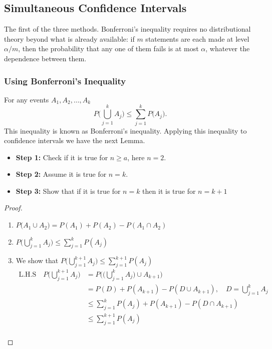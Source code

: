 \documentclass[11pt,a4paper]{article}
\theoremstyle{definition}
\begin{document}
\subsection*{Simultaneous Confidence Intervals}
The first of the three methods. Bonferroni's inequality requires no
distributional theory beyond what is already available: if $m$ statements are
each made at level $\alpha/m$, then the probability that any one of them fails
is at most $\alpha$, whatever the dependence between them.



\subsubsection*{Using Bonferroni's Inequality}

For any events $A_1, A_2,\ldots , A_k$ $$P\Bigg(\bigcup^k_{j=1}A_j\Bigg)\leq \sum^k_{j=1}P\big(A_j\big).$$ This inequality is known as Bonferroni's inequality. Applying this inequality to confidence intervals we have the next Lemma.\\

\begin{itemize}
\item[]\textbf{Step 1:} Check if it is true for $n\geq a$, here $n=2$.
\item[]\textbf{Step 2:} Assume it is true for $n=k$.
\item[]\textbf{Step 3:} Show that if it is true for $n=k$ then it is true for $n=k+1$\\
\end{itemize}


\begin{proof}
\begin{enumerate}
\item $P\big(A_1\cup A_2\big)=P(A_1)+P(A_2)-P(A_1\cap A_2)$
\item $P\Bigg(\bigcup\limits^k_{j=1}A_j\Bigg)\leq \displaystyle{\sum^k_{j=1}P(A_j)}$
\item We show that $\displaystyle{P\Bigg(\bigcup^{k+1}_{j=1}A_j\Bigg)\leq \sum^{k+1}_{j=1}P(A_j)}$
\begin{align*}
\text{L.H.S}\quad  P\Bigg(\bigcup^{k+1}_{j=1}A_j\Bigg) & = P\Bigg(\bigg(\bigcup^k_{j=1}A_j\big)\cup A_{k+1}\Bigg)\\
                                                               & = P(D)+P(A_{k+1})-P(D\cup A_{k+1}),\quad  D=\bigcup^k_{j=1}A_j\\
                                                               &\leq \sum^k_{j=1}P(A_j)+P(A_{k+1})-P(D\cap A_{k+1})\\
                                                               & \leq \sum^{k+1}_{j=1}P(A_j)\\
\end{align*}
\end{enumerate}
\end{proof}
\end{document}
